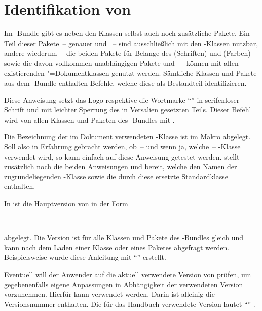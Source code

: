 \chapter{Identifikation von \TUDScript}
Im \TUDScript-Bundle gibt es neben den Klassen selbst auch noch zusätzliche 
Pakete. Ein Teil dieser Pakete~-- genauer  und 
~-- sind ausschließlich mit den \TUDScript-Klassen nutzbar, 
andere wiederum~-- die beiden Pakete für Belange des \CDs {} 
(Schriften) und  (Farben) sowie die davon vollkommen 
unabhängigen Pakete  und ~-- können mit 
allen existierenden "=Dokumentklassen genutzt werden. Sämtliche 
Klassen und Pakete aus dem \TUDScript-Bundle enthalten Befehle, welche diese 
als Bestandteil identifizieren.

\begin{Declaration}[v2.04]{}
\printdeclarationlist%
%
Diese Anweisung setzt das Logo respektive die Wortmarke \enquote{\TUDScript{}} 
in serifenloser Schrift und mit leichter Sperrung des in Versalien gesetzten 
Teils. Dieser Befehl wird von allen Klassen und Paketen des \TUDScript-Bundles 
mit .
\end{Declaration}

\begin{Declaration}[v2.04]{}
\printdeclarationlist%
%
Die Bezeichnung der im Dokument verwendeten \TUDScript-Klasse ist im Makro 
 abgelegt. Soll also in Erfahrung gebracht werden, 
ob~-- und wenn ja, welche~-- \TUDScript-Klasse verwendet wird, so kann einfach 
auf diese Anweisung getestet werden. \KOMAScript{} stellt zusätzlich noch die 
beiden Anweisungen  und  bereit, welche 
den Namen der zugrundeliegenden \KOMAScript-Klasse sowie die durch diese 
ersetzte Standardklasse enthalten.
\end{Declaration}

\begin{Declaration}[v2.04]{}
\begin{Declaration}[v2.05]{}
\printdeclarationlist%
%
In  ist die Hauptversion von \TUDScript in der Form
\begin{quoting}
~~
\end{quoting}
abgelegt. Die Version ist für alle Klassen und Pakete des \TUDScript-Bundles
gleich und kann nach dem Laden einer Klasse oder eines Paketes abgefragt 
werden. Beispielsweise wurde diese Anleitung mit \enquote{\TUDScriptVersion{}} 
erstellt.

Eventuell will der Anwender auf die aktuell verwendete Version von \TUDScript 
prüfen, um gegebenenfalls eigene Anpassungen in Abhängigkeit der verwendeten 
Version vorzunehmen. Hierfür kann  verwendet 
werden. Darin ist alleinig die Versionsnummer enthalten. Die für das Handbuch 
verwendete Version lautet \enquote{\TUDScriptVersionNumber{}} .
\end{Declaration}
\end{Declaration}
